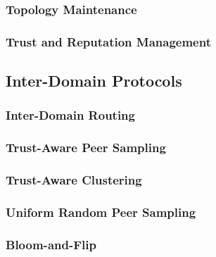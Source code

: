 \subsubsection{Topology Maintenance}


\subsubsection{Trust and Reputation Management}


\subsection{Inter-Domain Protocols}

\subsubsection{Inter-Domain Routing}

\subsubsection{Trust-Aware Peer Sampling}

\subsubsection{Trust-Aware Clustering}

\subsubsection{Uniform Random Peer Sampling}

\subsubsection{Bloom-and-Flip}

